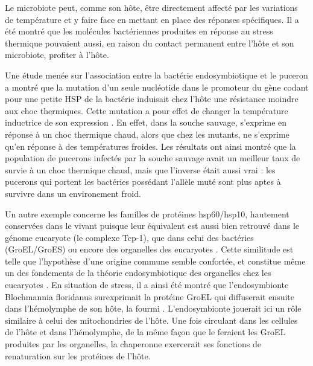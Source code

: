 Le microbiote peut, comme son hôte, être directement affecté par les variations de température et y faire face en mettant en place des réponses spécifiques.
Il a été montré que les molécules bactériennes produites en réponse au stress thermique pouvaient aussi, en raison du contact permanent entre l'hôte et son microbiote, profiter à l'hôte.

Une étude menée sur l'association entre la bactérie endosymbiotique  et le puceron  a montré que la mutation d'un seule nucléotide dans le promoteur du gène  codant pour une petite HSP de la bactérie induisait chez l'hôte une résistance moindre aux choc thermiques.
Cette mutation a pour effet de changer la température inductrice de son expression \cite{dunbar2007}.
En effet, dans la souche sauvage,  s'exprime en réponse à un choc thermique chaud, alors que chez les mutants,  ne s'exprime qu'en réponse à des températures froides.
Les résultats ont ainsi montré que la population de pucerons infectés par la souche sauvage avait un meilleur taux de survie à un choc thermique chaud, mais que l'inverse était aussi vrai : les pucerons qui portent les bactéries possédant l'allèle muté sont plus aptes à survivre dans un environement froid.

Un autre exemple concerne les familles de protéines hsp60/hsp10, hautement conservées dans le vivant puisque leur équivalent est aussi bien retrouvé dans le génome eucaryote (le complexe Tcp-1), que dans celui des bactéries (GroEL/GroES) ou encore des organelles des eucaryotes \cite{gupta1995}.
Cette similitude est telle que l'hypothèse d'une origine commune semble confortée, et constitue même un des fondements de la théorie endosymbiotique des organelles chez les eucaryotes \cite{gupta1995}.
En situation de stress, il a ainsi été montré que l'endosymbionte Blochmannia floridanus surexprimait la protéine GroEL qui diffuserait ensuite dans l’hémolymphe de son hôte, la fourmi  \cite{stoll2009, feldhaar2011}.
L'endosymbionte jouerait ici un rôle similaire à celui des mitochondries de l'hôte.
Une fois circulant dans les cellules de l'hôte et dans l'hémolymphe, de la même façon que le feraient les GroEL produites par les organelles, la chaperonne exercerait ses fonctions de renaturation sur les protéines de l'hôte.


